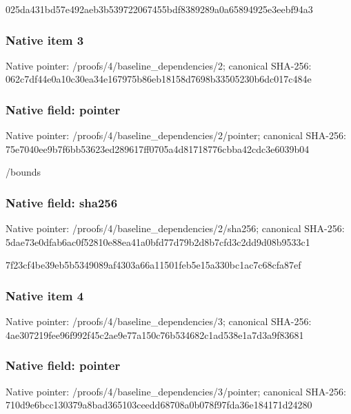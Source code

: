 \documentclass[10pt,a4paper]{article}
\begin{document}
\begingroup\raggedright\sloppy 025da431bd57e492aeb3b539722067455bdf8389289a0a65894925e3eebf94a3\par\endgroup

\subsubsection{Native item 3}
Native pointer: /proofs/4/baseline\_\allowbreak{}dependencies/2; canonical SHA-256: 062c7df44e0a10c30ea34e167975b86eb18158d7698b33505230b6dc017c484e

\subsubsection{Native field: pointer}
Native pointer: /proofs/4/baseline\_\allowbreak{}dependencies/2/pointer; canonical SHA-256: 75e7040ee9b7f6bb53623ed289617ff0705a4d81718776cbba42cdc3e6039b04

\begingroup\raggedright\sloppy /\allowbreak{}bounds\par\endgroup

\subsubsection{Native field: sha256}
Native pointer: /proofs/4/baseline\_\allowbreak{}dependencies/2/sha256; canonical SHA-256: 5dae73e0dfab6ac0f52810e88ea41a0bfd77d79b2d8b7cfd3c2dd9d08b9533c1

\begingroup\raggedright\sloppy 7f23cf4be39eb5b5349089af4303a66a11501feb5e15a330bc1ac7c68cfa87ef\par\endgroup

\subsubsection{Native item 4}
Native pointer: /proofs/4/baseline\_\allowbreak{}dependencies/3; canonical SHA-256: 4ae307219fee96f992f45c2ae9e77a150c76b534682c1ad538e1a7d3a9f83681

\subsubsection{Native field: pointer}
Native pointer: /proofs/4/baseline\_\allowbreak{}dependencies/3/pointer; canonical SHA-256: 710d9e6bcc130379a8bad365103ceedd68708a0b078f97fda36e184171d24280
\end{document}
